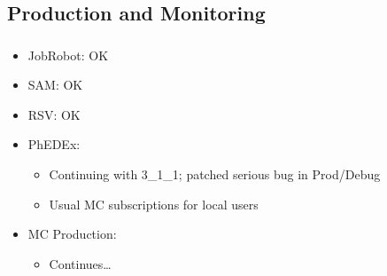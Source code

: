 \documentclass{beamer}
\begin{document}
\subsection{Production and Monitoring}
\begin{frame}
\frametitle{}
\begin{itemize}
     \item JobRobot: OK
     \item SAM: OK
     \item RSV: OK
     \item PhEDEx:
     \begin{itemize}
        \item Continuing with 3\_1\_1; patched serious bug in Prod/Debug
        \item Usual MC subscriptions for local users
     \end{itemize}
     \item MC Production:
     \begin{itemize}
        \item Continues\ldots{}
     \end{itemize}
\end{itemize}
\end{frame}
\end{document}
